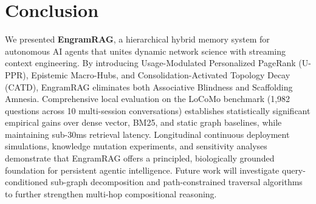 \documentclass[conference]{IEEEtran}
\begin{document}
\section{Conclusion}

We presented \textbf{EngramRAG}, a hierarchical hybrid memory system for autonomous AI agents that unites dynamic network science with streaming context engineering. By introducing Usage-Modulated Personalized PageRank (U-PPR), Epistemic Macro-Hubs, and Consolidation-Activated Topology Decay (CATD), EngramRAG eliminates both Associative Blindness and Scaffolding Amnesia. Comprehensive local evaluation on the LoCoMo benchmark (1,982 questions across 10 multi-session conversations) establishes statistically significant empirical gains over dense vector, BM25, and static graph baselines, while maintaining sub-30ms retrieval latency. Longitudinal continuous deployment simulations, knowledge mutation experiments, and sensitivity analyses demonstrate that EngramRAG offers a principled, biologically grounded foundation for persistent agentic intelligence. Future work will investigate query-conditioned sub-graph decomposition and path-constrained traversal algorithms to further strengthen multi-hop compositional reasoning.
\enlargethispage{2\baselineskip}



\end{document}
